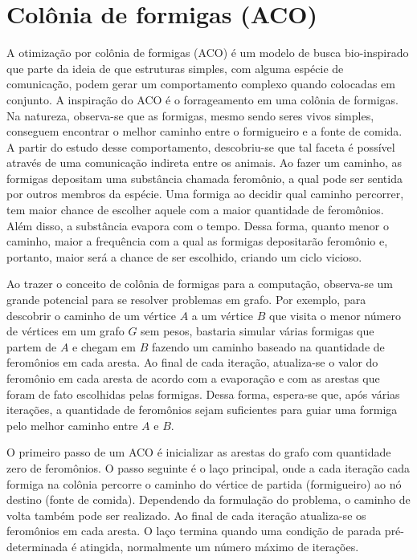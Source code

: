 \section{Colônia de formigas (ACO)}
A otimização por colônia de formigas (ACO) é um modelo de busca bio-inspirado que parte da ideia de que estruturas simples, com alguma espécie de comunicação, podem gerar um comportamento complexo quando colocadas em conjunto. A inspiração do ACO é o forrageamento em uma colônia de formigas. Na natureza, observa-se que as formigas, mesmo sendo seres vivos simples, conseguem encontrar o melhor caminho entre o formigueiro e a fonte de comida. A partir do estudo desse comportamento, descobriu-se que tal faceta é possível através de uma comunicação indireta entre os animais. Ao fazer um caminho, as formigas depositam uma substância chamada feromônio, a qual pode ser sentida por outros membros da espécie. Uma formiga ao decidir qual caminho percorrer, tem maior chance de escolher aquele com a maior quantidade de feromônios. Além disso, a substância evapora com o tempo. Dessa forma, quanto menor o caminho, maior a frequência com a qual as formigas depositarão feromônio e, portanto, maior será a chance de ser escolhido, criando um ciclo vicioso.

Ao trazer o conceito de colônia de formigas para a computação, observa-se um grande potencial para se resolver problemas em grafo. Por exemplo, para descobrir o caminho de um vértice $A$ a um vértice $B$ que visita o menor número de vértices em um grafo $G$ sem pesos, bastaria simular várias formigas que partem de $A$ e chegam em $B$ fazendo um caminho baseado na quantidade de feromônios em cada aresta. Ao final de cada iteração, atualiza-se o valor do feromônio em cada aresta de acordo com a evaporação e com as arestas que foram de fato escolhidas pelas formigas. Dessa forma, espera-se que, após várias iterações, a quantidade de feromônios sejam suficientes para guiar uma formiga pelo melhor caminho entre $A$ e $B$.

O primeiro passo de um ACO é inicializar as arestas do grafo com quantidade zero de feromônios. O passo seguinte é o laço principal, onde a cada iteração cada formiga na colônia percorre o caminho do vértice de partida (formigueiro) ao nó destino (fonte de comida). Dependendo da formulação do problema, o caminho de volta também pode ser realizado. Ao final de cada iteração atualiza-se os feromônios em cada aresta. O laço termina quando uma condição de parada pré-determinada é atingida, normalmente um número máximo de iterações.

